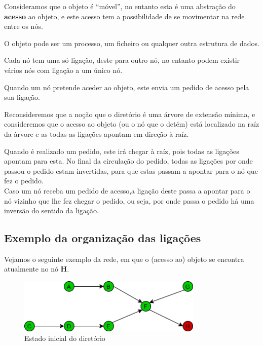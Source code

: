 Consideramos que o objeto é ``móvel'', no entanto esta é uma abstração do \textbf{acesso} ao objeto, e este acesso tem a possibilidade de se movimentar na rede entre os nós.

O objeto pode ser um processo, um ficheiro ou qualquer outra estrutura de dados.

Cada nó tem uma só ligação, deste para outro nó, no entanto podem existir vários nós com ligação a um único nó.


Quando um nó pretende aceder ao objeto, este envia um pedido de acesso pela sua ligação. 



Reconsideremos que a noção que o diretório é uma árvore de extensão mínima, e consideremos que o acesso ao objeto (ou o nó que o detém) está localizado na raíz da àrvore e as todas as ligações apontam em direção à raíz.

Quando é realizado um pedido, este irá chegar à raíz, pois todas as ligações apontam para esta. No final da circulação do pedido, todas as ligações por onde passou o pedido estam invertidas, para que estas passam a apontar para o nó que fez o pedido. \\

Caso um nó receba um pedido de acesso,a ligação deste passa a apontar para o nó vizinho que lhe fez chegar o pedido, ou seja, por onde passa o pedido há uma inversão do sentido da ligação.



\subsection*{Exemplo da organização das ligações}

Vejamos o seguinte exemplo da rede, em que o (acesso ao) objeto se encontra atualmente no nó \textbf{H}.

\begin{figure}[!htb]
\centering
\includegraphics[width=250pt]{um_pedido_1.png}
\caption{Estado inicial do diretório}
\end{figure}

